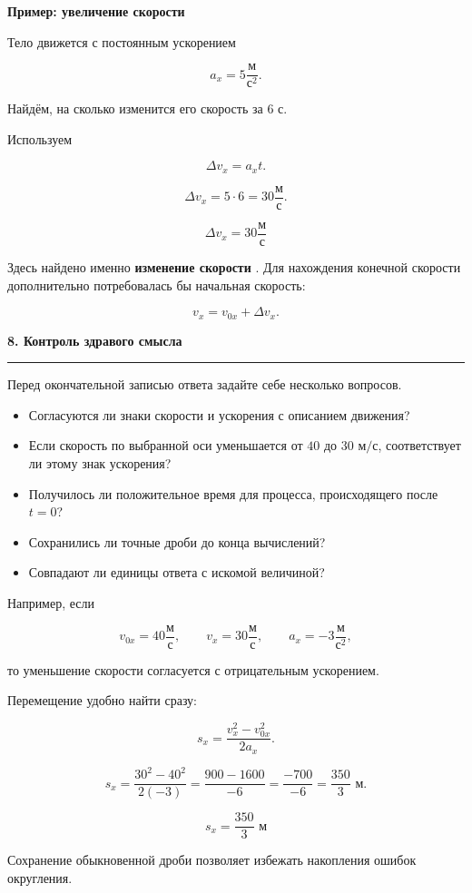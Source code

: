 \documentclass[a4paper,12pt]{article}
\newcommand{\sectiontitle}[1]{%
  \vspace{2mm}
  {\Large\bfseries\color{darkaccent}#1}\par
  \vspace{1mm}
  {\color{accent}\rule{\linewidth}{0.5pt}}
  \vspace{3mm}
}
\newcommand{\subsectiontitle}[1]{%
  \vspace{2mm}
  {\large\bfseries\color{darkaccent}#1}\par
  \vspace{1mm}
}
\newcommand{\important}[1]{%
  {\bfseries\color{darkaccent}#1}
}
\begin{document}
\subsectiontitle{Пример: увеличение скорости}

Тело движется с постоянным ускорением

\[
a_x=5\frac{\text{м}}{\text{с}^2}.
\]

Найдём, на сколько изменится его скорость за \(6\) с.

Используем

\[
\Delta v_x=a_xt.
\]

\[
\Delta v_x=5\cdot6=30\frac{\text{м}}{\text{с}}.
\]

\[
\boxed{
\Delta v_x=30\frac{\text{м}}{\text{с}}
}
\]

Здесь найдено именно \important{изменение скорости}. Для нахождения конечной скорости дополнительно потребовалась бы начальная скорость:

\[
v_x=v_{0x}+\Delta v_x.
\]

\sectiontitle{8. Контроль здравого смысла}

Перед окончательной записью ответа задайте себе несколько вопросов.

\begin{itemize}
  \item Согласуются ли знаки скорости и ускорения с описанием движения?
  \item Если скорость по выбранной оси уменьшается от \(40\) до \(30\text{ м/с}\), соответствует ли этому знак ускорения?
  \item Получилось ли положительное время для процесса, происходящего после \(t=0\)?
  \item Сохранились ли точные дроби до конца вычислений?
  \item Совпадают ли единицы ответа с искомой величиной?
\end{itemize}

Например, если

\[
v_{0x}=40\frac{\text{м}}{\text{с}},
\qquad
v_x=30\frac{\text{м}}{\text{с}},
\qquad
a_x=-3\frac{\text{м}}{\text{с}^2},
\]

то уменьшение скорости согласуется с отрицательным ускорением.

Перемещение удобно найти сразу:

\[
s_x=
\frac{v_x^2-v_{0x}^2}{2a_x}.
\]

\[
s_x=
\frac{30^2-40^2}{2(-3)}
=
\frac{900-1600}{-6}
=
\frac{-700}{-6}
=
\frac{350}{3}\text{ м}.
\]

\[
\boxed{
s_x=\frac{350}{3}\text{ м}
}
\]

Сохранение обыкновенной дроби позволяет избежать накопления ошибок округления.
\end{document}
